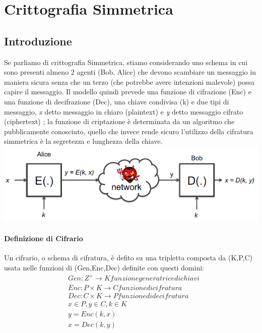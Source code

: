\documentclass{report}
\begin{document}
  \tableofcontents

    
  \chapter{Crittografia Simmetrica}
  \section{Introduzione}
    Se parliamo di crittografia Simmetrica, stiamo considerando uno schema in cui sono presenti almeno 2 agenti (Bob, Alice) che devono scambiare un messaggio in maniera sicura senza che un terzo (che potrebbe avere intenzioni malevole) possa capire il messaggio. 
    Il modello quindi prevede una funzione di cifrazione (Enc) e una funzione di decifrazione (Dec), una chiave condivisa (k) e due tipi di messaggio, \textit{x} detto messaggio in chiaro (plaintext) e \textit{y} detto messaggio cifrato (ciphertext) ; la funzione di criptazione è determinata da un algoritmo che pubblicamente conosciuto, quello che invece rende sicuro l'utilizzo della cifratura simmetrica è la segretezza e lunghezza della chiave. 
    \includegraphics{./immagini/modello.png} 
    
    \subsubsection{Definizione di Cifrario}
        Un cifrario, o schema di cifratura, è defito su una tripletta composta da (K,P,C) usata nelle funzioni di (Gen,Enc,Dec) definite con questi domini: 
         \begin{align}
            &Gen: Z^+ \to K funzione generatrice di chiavi\\  
            &Enc: P \times K \to C  funzione di cifratura\\
            &Dec : C \times K \to P funzione di decifratura\\
            &x \in P , y \in C , k \in K\\
            &y = Enc(k,x)\\
            &x = Dec(k,y)
        \end{align}
\end{document}
